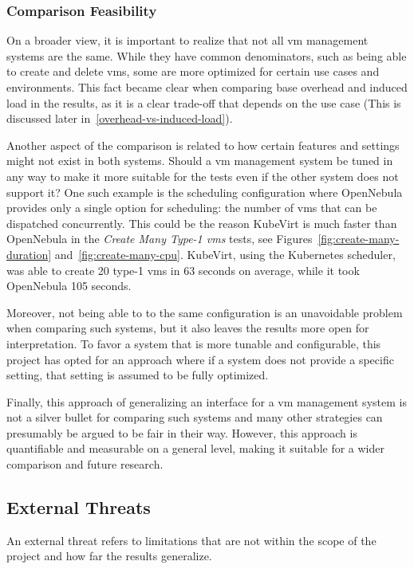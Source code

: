 \documentclass{kththesis}
\begin{document}
\begin{enumerate}
\subsubsection{Comparison Feasibility}

On a broader view, it is important to realize that not all \Gls{vm} management systems are the same. While they have common denominators, such as being able to create and delete \Glspl{vm}, some are more optimized for certain use cases and environments. This fact became clear when comparing base overhead and induced load in the results, as it is a clear trade-off that depends on the use case (This is discussed later in\ \ref{overhead-vs-induced-load}).

Another aspect of the comparison is related to how certain features and settings might not exist in both systems. Should a \Gls{vm} management system be tuned in any way to make it more suitable for the tests even if the other system does not support it? One such example is the scheduling configuration where OpenNebula provides only a single option for scheduling: the number of \Glspl{vm} that can be dispatched concurrently. This could be the reason KubeVirt is much faster than OpenNebula in the \textit{Create Many Type-1 \Glspl{vm}} tests, see Figures\ \ref{fig:create-many-duration} and\ \ref{fig:create-many-cpu}. KubeVirt, using the Kubernetes scheduler, was able to create 20 type-1 \Glspl{vm} in 63 seconds on average, while it took OpenNebula 105 seconds. 

Moreover, not being able to to the same configuration is an unavoidable problem when comparing such systems, but it also leaves the results more open for interpretation. To favor a system that is more tunable and configurable, this project has opted for an approach where if a system does not provide a specific setting, that setting is assumed to be fully optimized. 

Finally, this approach of generalizing an interface for a \Gls{vm} management system is not a silver bullet for comparing such systems and many other strategies can presumably be argued to be fair in their way. However, this approach is quantifiable and measurable on a general level, making it suitable for a wider comparison and future research. 

\subsection{External Threats}
An external threat refers to limitations that are not within the scope of the project and how far the results generalize. 


\end{enumerate}
\end{document}
